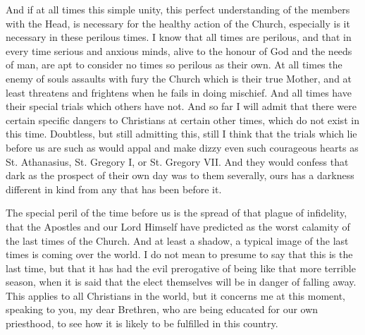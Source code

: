 And if at all times this simple unity, this
perfect understanding of the members with the Head, is necessary for
the healthy action of the Church, especially is it necessary in these
perilous times. I know that all times are perilous, and that in every
time serious and anxious minds, alive to the honour of God and the
needs of man, are apt to consider no times so perilous as their own.
At all times the enemy of souls assaults with fury the Church which is
their true Mother, and at least threatens and frightens when he fails
in doing mischief. And all times have their special trials which
others have not. And so far I will admit that there were certain
specific dangers to Christians at certain other times, which do not
exist in this time. Doubtless, but still admitting this, still I think
that the trials which lie before us are such as would appal and
make dizzy even such courageous hearts as St. Athanasius, St. Gregory
I, or St. Gregory VII. And they would confess that dark as the
prospect of their own day was to them severally, ours has a darkness
different in kind from any that has been before it.

The special peril of the time before us is the
spread of that plague of infidelity, that the Apostles and our Lord
Himself have predicted as the worst calamity of the last times of the
Church. And at least a shadow, a typical image of the last times is
coming over the world. I do not mean to presume to say that this is
the last time, but that it has had the evil prerogative of being like
that more terrible season, when it is said that the elect themselves
will be in danger of falling away. This applies to all Christians in
the world, but it concerns me at this moment, speaking to you, my dear
Brethren, who are being educated for our own priesthood, to see how it
is likely to be fulfilled in this country.

